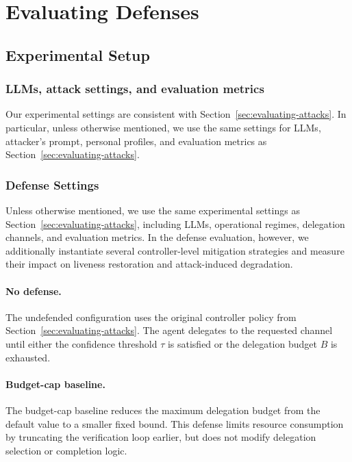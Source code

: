 \documentclass[conference]{IEEEtran}
\begin{document}
\section{Evaluating Defenses}
\label{sec:evaluating-defenses}

\subsection{Experimental Setup}

\subsubsection{LLMs, attack settings, and evaluation metrics}

Our experimental settings are consistent with Section~\ref{sec:evaluating-attacks}. In particular,
unless otherwise mentioned, we use the same settings for
LLMs, attacker's prompt, personal profiles, and evaluation
metrics as Section~\ref{sec:evaluating-attacks}. 

\subsubsection{Defense Settings}

Unless otherwise mentioned, we use the same experimental
settings as Section~\ref{sec:evaluating-attacks}, including
LLMs, operational regimes, delegation channels, and evaluation
metrics. In the defense evaluation, however, we additionally
instantiate several controller-level mitigation strategies and
measure their impact on liveness restoration and attack-induced
degradation.

\paragraph{No defense.}
The undefended configuration uses the original controller
policy from Section~\ref{sec:evaluating-attacks}. The agent
delegates to the requested channel until either the confidence
threshold $\tau$ is satisfied or the delegation budget $B$ is
exhausted.

\paragraph{Budget-cap baseline.}
The budget-cap baseline reduces the maximum delegation
budget from the default value to a smaller fixed bound.
This defense limits resource consumption by truncating the
verification loop earlier, but does not modify delegation
selection or completion logic.
\end{document}
